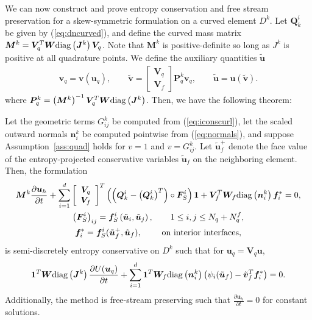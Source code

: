 \documentclass{svjour3}                     %
\newcommand{\diag}[1]{{\rm diag}\LRp{#1}}
\newcommand{\pd}[2]{\frac{\partial#1}{\partial#2}}
\newcommand{\LRp}[1]{\left( #1 \right)}
\newcommand{\LRs}[1]{\left[ #1 \right]}
\begin{document}
We can now construct and prove entropy conservation and free stream preservation for a skew-symmetric formulation on a curved element $D^k$.  Let $\bm{Q}^i_k$ be given by (\ref{eq:dncurved}), and define the curved mass matrix $\bm{M}^k = \bm{V}_q^T\bm{W}\diag{\bm{J}^k}\bm{V}_q$.  Note that $\bm{M}^k$ is positive-definite so long as $J^k$ is positive at all quadrature points.  We define the auxiliary quantities $\tilde{\bm{u}}$ 
\begin{gather*}
\bm{v}_q = \bm{v}\LRp{\bm{u}_q}, \qquad \tilde{\bm{v}} = \begin{bmatrix}
\bm{V}_q\\
\bm{V}_f
\end{bmatrix}\bm{P}^k_q\bm{v}_q, \qquad \tilde{\bm{u}} = \bm{u}\LRp{\tilde{\bm{v}}}.
\end{gather*}
where $\bm{P}^k_q = \LRp{\bm{M}^k}^{-1}\bm{V}_q^T\bm{W}\diag{\bm{J}^k}$.  Then, we have the following theorem:
\begin{theorem}
\label{thm:skewformcurved}
Let the geometric terms $G^k_{ij}$ be computed from (\ref{eq:iconscurl}), let the scaled outward normals $\bm{n}^k_i$ be computed pointwise from (\ref{eq:normals}), and suppose Assumption~\ref{ass:quad} holds for $v = 1$ and $v= G^k_{ij}$.  Let $\tilde{\bm{u}}_f^+$ denote the face value of the entropy-projected conservative variables $\tilde{\bm{u}}_f$ on the neighboring element.  Then, the formulation
\begin{gather}
\bm{M}^k\pd{\bm{u}_h}{t} + 
\sum_{i=1}^d \LRs{\begin{array}{cc}
\bm{V}_q \\
\bm{V}_f\end{array}}^T \LRp{\LRp{\bm{Q}^i_k - \LRp{\bm{Q}^i_k}^T} \circ \bm{F}^i_S}\bm{1} + \bm{V}_f^T \bm{W}_f \diag{{\bm{n}^k_i}}\bm{f}_i^* = 0, \label{eq:skewformcurved}\\
\LRp{\bm{F}^i_S}_{ij} = \bm{f}^i_S\LRp{\tilde{\bm{u}}_i,\tilde{\bm{u}}_j}, \qquad 1\leq i,j\leq N_q + N^f_q, \nonumber\\
\bm{f}_i^* = \bm{f}^i_S(\tilde{\bm{u}}_f^+,\tilde{\bm{u}}_f), \qquad \text{ on interior interfaces,} \nonumber
\end{gather}
is semi-discretely entropy conservative on $D^k$ such that for $\bm{u}_q = \bm{V}_q\bm{u}$,
\begin{gather*}
\bm{1}^T\bm{W}\diag{\bm{J}^k}\pd{U(\bm{u}_q)}{t} + \sum_{i=1}^d\bm{1}^T\bm{W}_f \diag{\bm{n}^k_i} \LRp{\psi_i(\tilde{\bm{u}}_f) - \tilde{\bm{v}}_f^T\bm{f}_i^*} = 0.
\end{gather*}
Additionally, the method is free-stream preserving such that $\pd{\bm{u}_h}{t} = 0$ for constant solutions.
\end{theorem}
\end{document}
